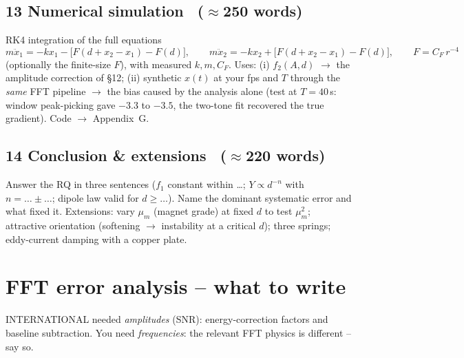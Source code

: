 \documentclass[11pt,a4paper]{article}
\newcommand{\Y}{Y}                       %
\newcommand{\mum}{\mu_m}
\newcommand{\words}[1]{~{\small\color{gray}($\approx$#1 words)}}
\begin{document}
\subsection*{13 Numerical simulation \words{250}}
RK4 integration of the full equations
\begin{equation}
  m\ddot x_1=-kx_1-\big[F(d+x_2-x_1)-F(d)\big],\qquad
  m\ddot x_2=-kx_2+\big[F(d+x_2-x_1)-F(d)\big],\qquad F=C_F\,r^{-4}
\end{equation}
(optionally the finite-size $F$), with measured $k,m,C_F$. Uses: (i) $f_2(A,d)$ $\to$ the
amplitude correction of \S12; (ii) synthetic $x(t)$ at your fps and $T$ through the
\emph{same} FFT pipeline $\to$ the bias caused by the analysis alone (test at $T=40$\,s:
window peak-picking gave $-3.3$ to $-3.5$, the two-tone fit recovered the true gradient).
Code $\to$ Appendix~G.

\subsection*{14 Conclusion \& extensions \words{220}}
Answer the RQ in three sentences ($f_1$ constant within \ldots; $\Y\propto d^{-n}$ with
$n=\ldots\pm\ldots$; dipole law valid for $d\ge\ldots$). Name the dominant systematic error
and what fixed it. Extensions: vary $\mum$ (magnet grade) at fixed $d$ to test $\mum^2$;
attractive orientation (softening $\to$ instability at a critical $d$); three springs;
eddy-current damping with a copper plate.

\section{FFT error analysis -- what to write}\label{sec:fft}

INTERNATIONAL needed \emph{amplitudes} (SNR): energy-correction factors and baseline
subtraction. You need \emph{frequencies}: the relevant FFT physics is different -- say so.
\end{document}
